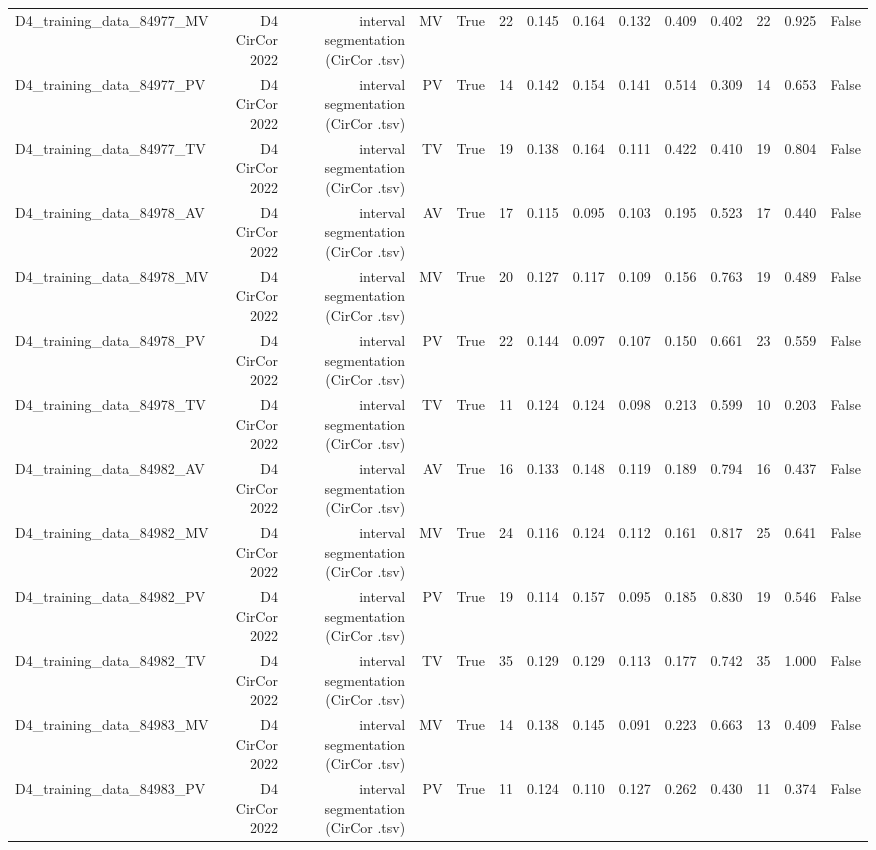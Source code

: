 \begin{table}[htbp]
\begin{tabular}{lrrrrrrrrrrrrr}
    D4\_training\_data\_84977\_MV & D4 CirCor 2022 & interval segmentation (CirCor .tsv) & MV & True & 22 & 0.145 & 0.164 & 0.132 & 0.409 & 0.402 & 22 & 0.925 & False \\
    D4\_training\_data\_84977\_PV & D4 CirCor 2022 & interval segmentation (CirCor .tsv) & PV & True & 14 & 0.142 & 0.154 & 0.141 & 0.514 & 0.309 & 14 & 0.653 & False \\
    D4\_training\_data\_84977\_TV & D4 CirCor 2022 & interval segmentation (CirCor .tsv) & TV & True & 19 & 0.138 & 0.164 & 0.111 & 0.422 & 0.410 & 19 & 0.804 & False \\
    D4\_training\_data\_84978\_AV & D4 CirCor 2022 & interval segmentation (CirCor .tsv) & AV & True & 17 & 0.115 & 0.095 & 0.103 & 0.195 & 0.523 & 17 & 0.440 & False \\
    D4\_training\_data\_84978\_MV & D4 CirCor 2022 & interval segmentation (CirCor .tsv) & MV & True & 20 & 0.127 & 0.117 & 0.109 & 0.156 & 0.763 & 19 & 0.489 & False \\
    D4\_training\_data\_84978\_PV & D4 CirCor 2022 & interval segmentation (CirCor .tsv) & PV & True & 22 & 0.144 & 0.097 & 0.107 & 0.150 & 0.661 & 23 & 0.559 & False \\
    D4\_training\_data\_84978\_TV & D4 CirCor 2022 & interval segmentation (CirCor .tsv) & TV & True & 11 & 0.124 & 0.124 & 0.098 & 0.213 & 0.599 & 10 & 0.203 & False \\
    D4\_training\_data\_84982\_AV & D4 CirCor 2022 & interval segmentation (CirCor .tsv) & AV & True & 16 & 0.133 & 0.148 & 0.119 & 0.189 & 0.794 & 16 & 0.437 & False \\
    D4\_training\_data\_84982\_MV & D4 CirCor 2022 & interval segmentation (CirCor .tsv) & MV & True & 24 & 0.116 & 0.124 & 0.112 & 0.161 & 0.817 & 25 & 0.641 & False \\
    D4\_training\_data\_84982\_PV & D4 CirCor 2022 & interval segmentation (CirCor .tsv) & PV & True & 19 & 0.114 & 0.157 & 0.095 & 0.185 & 0.830 & 19 & 0.546 & False \\
    D4\_training\_data\_84982\_TV & D4 CirCor 2022 & interval segmentation (CirCor .tsv) & TV & True & 35 & 0.129 & 0.129 & 0.113 & 0.177 & 0.742 & 35 & 1.000 & False \\
    D4\_training\_data\_84983\_MV & D4 CirCor 2022 & interval segmentation (CirCor .tsv) & MV & True & 14 & 0.138 & 0.145 & 0.091 & 0.223 & 0.663 & 13 & 0.409 & False \\
    D4\_training\_data\_84983\_PV & D4 CirCor 2022 & interval segmentation (CirCor .tsv) & PV & True & 11 & 0.124 & 0.110 & 0.127 & 0.262 & 0.430 & 11 & 0.374 & False \\

\end{tabular}
\end{table}
